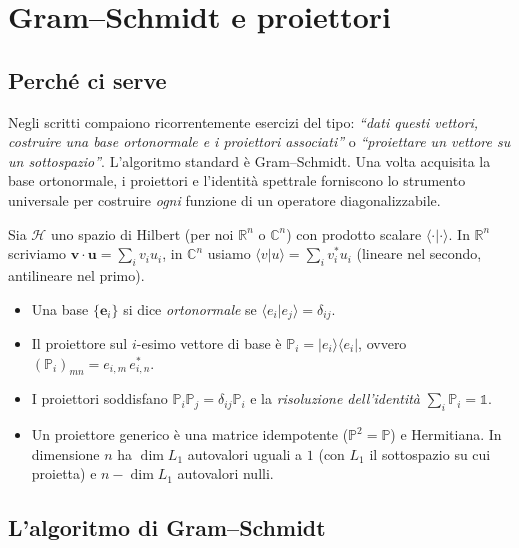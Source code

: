 \documentclass[11pt,a4paper,openany]{book}
\theoremstyle{definition}
\newcommand{\R}{\mathbb{R}}
\newcommand{\C}{\mathbb{C}}
\renewcommand{\H}{\mathcal{H}}
\newcommand{\ket}[1]{|#1\rangle}
\newcommand{\bra}[1]{\langle#1|}
\newcommand{\braket}[2]{\langle#1|#2\rangle}
\begin{document}
\chapter{Gram--Schmidt e proiettori}

\section{Perch\'e ci serve}
Negli scritti compaiono ricorrentemente esercizi del tipo: \emph{``dati questi vettori, costruire una base ortonormale e i proiettori associati''} o \emph{``proiettare un vettore su un sottospazio''}. L'algoritmo standard \`e Gram--Schmidt. Una volta acquisita la base ortonormale, i proiettori e l'identit\`a spettrale forniscono lo strumento universale per costruire \emph{ogni} funzione di un operatore diagonalizzabile.

\begin{teoria}
Sia $\H$ uno spazio di Hilbert (per noi $\R^n$ o $\C^n$) con prodotto scalare $\braket{\cdot}{\cdot}$. In $\R^n$ scriviamo $\bm v\cdot \bm u=\sum_i v_i u_i$, in $\C^n$ usiamo $\braket{v}{u}=\sum_i v_i^* u_i$ (lineare nel secondo, antilineare nel primo).
\begin{itemize}
\item Una base \(\{\bm e_i\}\) si dice \emph{ortonormale} se $\braket{e_i}{e_j}=\delta_{ij}$.
\item Il proiettore sul $i$-esimo vettore di base \`e $\mathbb P_i=\ket{e_i}\bra{e_i}$, ovvero $(\mathbb P_i)_{mn}=e_{i,m}\,e_{i,n}^*$.
\item I proiettori soddisfano $\mathbb P_i \mathbb P_j=\delta_{ij}\mathbb P_i$ e la \emph{risoluzione dell'identit\`a} $\sum_i\mathbb P_i=\mathbb 1$.
\item Un proiettore generico \`e una matrice idempotente ($\mathbb P^2=\mathbb P$) e Hermitiana. In dimensione $n$ ha $\dim L_1$ autovalori uguali a $1$ (con $L_1$ il sottospazio su cui proietta) e $n-\dim L_1$ autovalori nulli.
\end{itemize}
\end{teoria}

\section{L'algoritmo di Gram--Schmidt}
\end{document}
